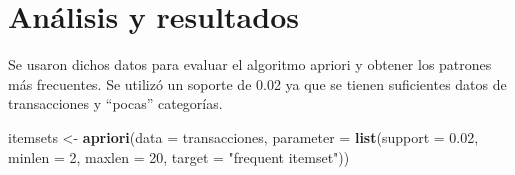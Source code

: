 \documentclass[]{article}
\newenvironment{Shaded}{\begin{snugshade}}{\end{snugshade}}
\newcommand{\KeywordTok}[1]{\textcolor[rgb]{0.13,0.29,0.53}{\textbf{#1}}}
\newcommand{\DataTypeTok}[1]{\textcolor[rgb]{0.13,0.29,0.53}{#1}}
\newcommand{\DecValTok}[1]{\textcolor[rgb]{0.00,0.00,0.81}{#1}}
\newcommand{\FloatTok}[1]{\textcolor[rgb]{0.00,0.00,0.81}{#1}}
\newcommand{\StringTok}[1]{\textcolor[rgb]{0.31,0.60,0.02}{#1}}
\newcommand{\OtherTok}[1]{\textcolor[rgb]{0.56,0.35,0.01}{#1}}
\newcommand{\OperatorTok}[1]{\textcolor[rgb]{0.81,0.36,0.00}{\textbf{#1}}}
\newcommand{\NormalTok}[1]{#1}
\begin{document}
\begin{Shaded}
\end{Shaded}

\section{Análisis y resultados}\label{analisis-y-resultados}

Se usaron dichos datos para evaluar el algoritmo apriori y obtener los
patrones más frecuentes. Se utilizó un soporte de 0.02 ya que se tienen
suficientes datos de transacciones y ``pocas'' categorías.

\begin{Shaded}
\begin{Highlighting}[]
\NormalTok{itemsets <-}\StringTok{ }\KeywordTok{apriori}\NormalTok{(}\DataTypeTok{data =}\NormalTok{ transacciones,}
                    \DataTypeTok{parameter =} \KeywordTok{list}\NormalTok{(}\DataTypeTok{support =} \FloatTok{0.02}\NormalTok{,}
                                     \DataTypeTok{minlen =} \DecValTok{2}\NormalTok{,}
                                     \DataTypeTok{maxlen =} \DecValTok{20}\NormalTok{,}
                                     \DataTypeTok{target =} \StringTok{"frequent itemset"}\NormalTok{))}
\end{Highlighting}
\end{Shaded}
\end{document}
